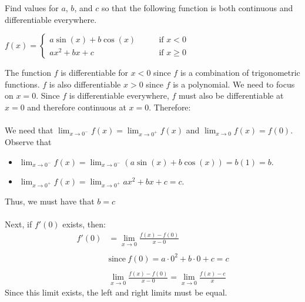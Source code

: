 \documentclass[nooutcomes]{ximera}
\begin{document}
\begin{problem}
Find values for $a$, $b$, and $c$ so that the following function is both continuous and differentiable everywhere.

$f(x) =   \left\{ \begin{array}{cl}
	a \sin(x) + b \cos(x)		 	&	\qquad \text{if } x < 0					\\
	ax^2 + bx + c   				&	\qquad \text{if } x \geq 0	 \end{array} \right.  $
		\begin{freeResponse}
		The function $f$ is differentiable for $x<0$ since $f$ is a combination of trigonometric functions.  $f$ is also differentiable $x>0$ since $f$ is a polynomial.  We need to focus on $x=0$.  Since $f$ is differentiable everywhere, $f$ must also be differentiable at $x=0$ and therefore continuous at $x=0$.  Therefore: \\\\
We need that $\lim_{x \to 0^-} f(x) = \lim_{x \to 0^+} f(x)$ and $\lim_{x \to 0} f(x)=f(0)$.  Observe that
		
		\begin{itemize}
		
		\item $\lim_{x \to 0^-} f(x) 
		= \lim_{x \to 0^-} (a\sin(x) + b\cos(x))
		= b(1) = b$.
		
		\item  $ \lim_{x \to 0^+} f(x)
		= \lim_{x \to 0^+} ax^2 + bx + c 
		= c$.
		
		\end{itemize}
		
		Thus, we must have that $b = c$\\\\
		Next, if $f'(0)$ exists, then:
		\begin{align*}
		f'(0)&=\lim_{x\to 0} \frac{f(x)-f(0)}{x-0}\\\\
		& \text{since}\ f(0)=a \cdot 0^2+b \cdot 0 +c =c\\\\
		& \lim_{x\to 0} \frac{f(x)-f(0)}{x-0}=\lim_{x\to 0} \frac{f(x)-c}{x}
		\end{align*}
		Since this limit exists, the left and right limits must be equal.
		

\end{freeResponse}
\end{problem}
\end{document}
